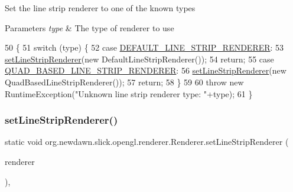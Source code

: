 Set the line strip renderer to one of the known types


\begin{DoxyParams}{Parameters}
{\em type} & The type of renderer to use \\
\hline
\end{DoxyParams}

\begin{DoxyCode}
50                                                       \{
51         \textcolor{keywordflow}{switch} (type) \{
52         \textcolor{keywordflow}{case} \mbox{\hyperlink{classorg_1_1newdawn_1_1slick_1_1opengl_1_1renderer_1_1_renderer_aaf62f21044202dd497512946fe32de8e}{DEFAULT\_LINE\_STRIP\_RENDERER}}:
53             \mbox{\hyperlink{classorg_1_1newdawn_1_1slick_1_1opengl_1_1renderer_1_1_renderer_ad7172b7f319fc169ed3bbd2cab844b64}{setLineStripRenderer}}(\textcolor{keyword}{new} DefaultLineStripRenderer());
54             \textcolor{keywordflow}{return};
55         \textcolor{keywordflow}{case} \mbox{\hyperlink{classorg_1_1newdawn_1_1slick_1_1opengl_1_1renderer_1_1_renderer_a683e73dc21ff6bc56e533a1e10a01f8f}{QUAD\_BASED\_LINE\_STRIP\_RENDERER}}:
56             \mbox{\hyperlink{classorg_1_1newdawn_1_1slick_1_1opengl_1_1renderer_1_1_renderer_ad7172b7f319fc169ed3bbd2cab844b64}{setLineStripRenderer}}(\textcolor{keyword}{new} QuadBasedLineStripRenderer());
57             \textcolor{keywordflow}{return};
58         \}
59         
60         \textcolor{keywordflow}{throw} \textcolor{keyword}{new} RuntimeException(\textcolor{stringliteral}{"Unknown line strip renderer type: "}+type);
61     \}
\end{DoxyCode}
\mbox{\label{classorg_1_1newdawn_1_1slick_1_1opengl_1_1renderer_1_1_renderer_a7553b5b841479d2213692f05d27652a9}} 
\subsubsection{\texorpdfstring{set\+Line\+Strip\+Renderer()}{setLineStripRenderer()}\hspace{0.1cm}{\footnotesize\ttfamily [2/2]}}
{\footnotesize\ttfamily static void org.\+newdawn.\+slick.\+opengl.\+renderer.\+Renderer.\+set\+Line\+Strip\+Renderer (\begin{DoxyParamCaption}\item[{\mbox{\hyperlink{interfaceorg_1_1newdawn_1_1slick_1_1opengl_1_1renderer_1_1_line_strip_renderer}{Line\+Strip\+Renderer}}}]{renderer }\end{DoxyParamCaption})\hspace{0.3cm}{\ttfamily [inline]}, {\ttfamily [static]}}

